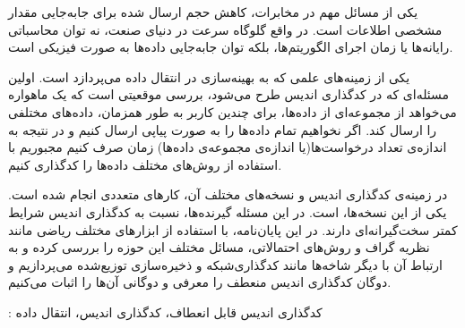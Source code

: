 


\begin{center}
\end{center}
\noindent

یکی از مسائل مهم در مخابرات، کاهش حجم ارسال شده برای جابه‌جایی مقدار مشخصی اطلاعات است. در واقع گلوگاه سرعت در دنیای صنعت، نه توان محاسباتی رایانه‌ها یا زمان اجرای الگوریتم‌ها، بلکه توان جابه‌جایی داده‌ها به صورت فیزیکی است.

یکی از زمینه‌های علمی که به بهینه‌سازی در انتقال داده می‌پردازد است. اولین مسئله‌ای که در کدگذاری اندیس طرح می‌شود، بررسی موقعیتی است که یک ماهواره می‌خواهد از مجموعه‌ای از داده‌ها، برای چندین کاربر به طور همزمان، داده‌های مختلفی را ارسال کند. اگر نخواهیم تمام داده‌ها را به صورت پیاپی ارسال کنیم و در نتیجه به اندازه‌ی تعداد درخواست‌ها(یا اندازه‌ی مجموعه‌ی داده‌ها) زمان صرف کنیم مجبوریم با استفاده از روش‌های مختلف داده‌ها را کدگذاری کنیم.

در زمینه‌ی کدگذاری اندیس و نسخه‌های مختلف آن، کارهای متعددی انجام شده است. یکی از این نسخه‌ها،  است. در این مسئله گیرنده‌ها، نسبت به کدگذاری اندیس شرایط کمتر سخت‌گیرانه‌ای دارند. در این پایان‌‌نامه، با استفاده از ابزارهای مختلف ریاضی مانند نظریه گراف و روش‌های احتمالاتی، مسائل مختلف این حوزه را بررسی کرده و به ارتباط آن با دیگر شاخه‌ها مانند کدگذار‌ی‌شبکه و ذخیره‌سازی توزیع‌شده می‌پردازیم و دوگان کدگذاری اندیس منعطف را معرفی و دوگانی آن‌ها را اثبات می‌کنیم.

\bigskip
\noindent {}:
کدگذاری اندیس قابل انعطاف، کدگذاری اندیس، انتقال داده
\newpage
